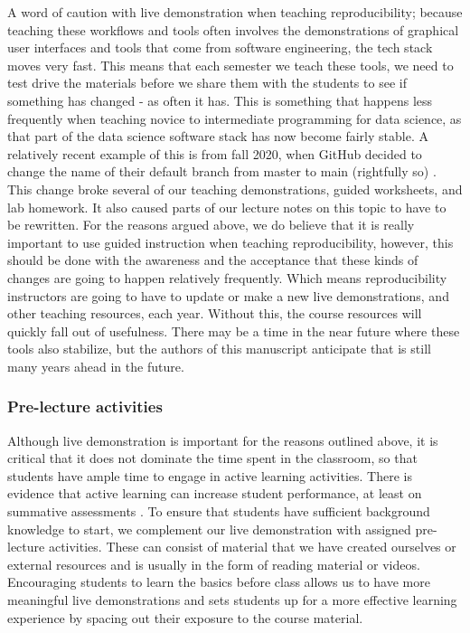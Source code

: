 \documentclass[
  12 pt,
]{paper}
\begin{document}
A word of caution with live demonstration when teaching reproducibility;
because teaching these workflows and tools often involves
the demonstrations of graphical user interfaces
and tools that come from software engineering,
the tech stack moves very fast.
This means that each semester we teach these tools,
we need to test drive the materials before we share them with the students
to see if something has changed - as often it has.
This is something that happens less frequently when teaching
novice to intermediate programming for data science,
as that part of the data science software stack has now become fairly stable.
A relatively recent example of this is from fall 2020,
when GitHub decided to change the name of their default branch
from master to main (rightfully so) \autocite{__ak}.
This change broke several of our teaching demonstrations,
guided worksheets, and lab homework.
It also caused parts of our lecture notes on this topic to have to be rewritten.
For the reasons argued above, we do believe that it is really important
to use guided instruction when teaching reproducibility,
however, this should be done with the awareness and the acceptance
that these kinds of changes are going to happen relatively frequently.
Which means reproducibility instructors are going to have to
update or make a new live demonstrations, and other teaching resources,
each year.
Without this, the course resources will quickly fall out of usefulness.
There may be a time in the near future where these tools also stabilize,
but the authors of this manuscript anticipate that is still
many years ahead in the future.

\hypertarget{pre-lecture-activities}{%
\subsubsection{Pre-lecture activities}\label{pre-lecture-activities}}

Although live demonstration is important for the reasons outlined above,
it is critical that it does not dominate the time spent in the classroom,
so that students have ample time to engage in active learning activities.
There is evidence that active learning can increase student performance,
at least on summative assessments \autocite{freeman2014active}.
To ensure that students have sufficient background knowledge
to start, we complement our live demonstration with assigned pre-lecture activities.
These can consist of material that we have created ourselves or external resources
and is usually in the form of reading material or videos.
Encouraging students to learn the basics before class
allows us to have more meaningful live demonstrations
and sets students up for a more effective learning experience
by spacing out their exposure to the course material.
\end{document}
